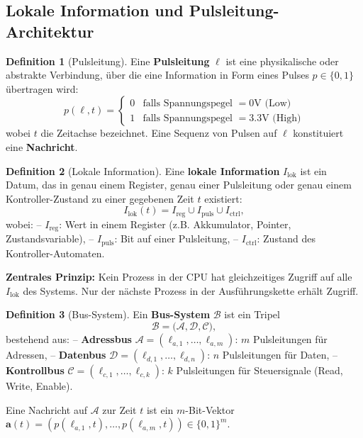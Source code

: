 \documentclass[a4paper,12pt]{article}
\theoremstyle{definition}
\newtheorem{definition}{Definition}
\begin{document}
\subsection{Lokale Information und Pulsleitung-Architektur}

\begin{definition}[Pulsleitung]
	Eine \textbf{Pulsleitung} $\ell$ ist eine physikalische oder abstrakte Verbindung, über die eine Information in Form eines Pulses $p \in \{0, 1\}$ übertragen wird:
	\[
	p(\ell, t) = \begin{cases}
		0 & \text{falls Spannungspegel } = 0\text{V (Low)} \\
		1 & \text{falls Spannungspegel } = 3.3\text{V (High)}
	\end{cases}
	\]
	wobei $t$ die Zeitachse bezeichnet. Eine Sequenz von Pulsen auf $\ell$ konstituiert eine \textbf{Nachricht}.
\end{definition}

\begin{definition}[Lokale Information]
	Eine \textbf{lokale Information} $I_{\text{lok}}$ ist ein Datum, das in genau einem Register, genau einer Pulsleitung oder genau einem Kontroller-Zustand zu einer gegebenen Zeit $t$ existiert:
	\[
	I_{\text{lok}}(t) = I_{\text{reg}} \cup I_{\text{puls}} \cup I_{\text{ctrl}},
	\]
	wobei:
	-- $I_{\text{reg}}$: Wert in einem Register (z.B. Akkumulator, Pointer, Zustandsvariable),
	-- $I_{\text{puls}}$: Bit auf einer Pulsleitung,
	-- $I_{\text{ctrl}}$: Zustand des Kontroller-Automaten.
	
	\textbf{Zentrales Prinzip:} Kein Prozess in der CPU hat gleichzeitiges Zugriff auf alle $I_{\text{lok}}$ des Systems. Nur der nächste Prozess in der Ausführungskette erhält Zugriff.
\end{definition}

\begin{definition}[Bus-System]
	Ein \textbf{Bus-System} $\mathcal{B}$ ist ein Tripel
	\[
	\mathcal{B} = \bigl(\mathcal{A}, \mathcal{D}, \mathcal{C}\bigr),
	\]
	bestehend aus:
	-- \textbf{Adressbus} $\mathcal{A} = (\ell_{a,1}, \ldots, \ell_{a,m})$: $m$ Pulsleitungen für Adressen,
	-- \textbf{Datenbus} $\mathcal{D} = (\ell_{d,1}, \ldots, \ell_{d,n})$: $n$ Pulsleitungen für Daten,
	-- \textbf{Kontrollbus} $\mathcal{C} = (\ell_{c,1}, \ldots, \ell_{c,k})$: $k$ Pulsleitungen für Steuersignale (Read, Write, Enable).
	
	Eine Nachricht auf $\mathcal{A}$ zur Zeit $t$ ist ein $m$-Bit-Vektor $\mathbf{a}(t) = (p(\ell_{a,1}, t), \ldots, p(\ell_{a,m}, t)) \in \{0,1\}^m$.
\end{definition}
\end{document}
